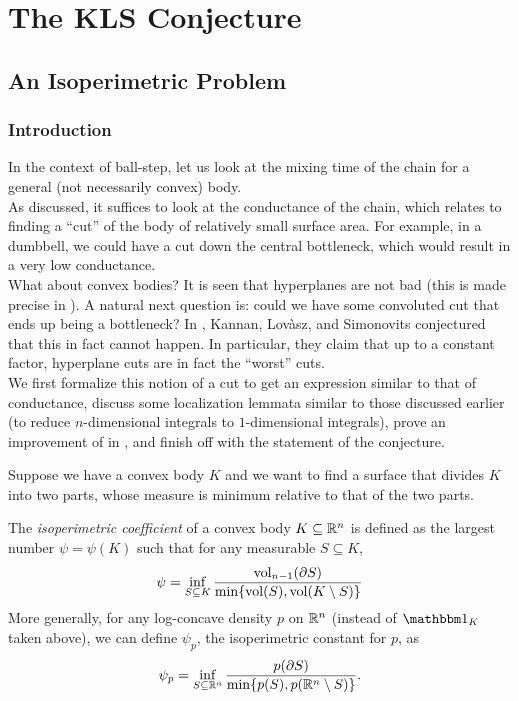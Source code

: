 \section{The KLS Conjecture}

\subsection{An Isoperimetric Problem}

	\subsubsection{Introduction}

		In the context of ball-step, let us look at the mixing time of the chain for a general (not necessarily convex) body.\\
		As discussed, it suffices to look at the conductance of the chain, which relates to finding a ``cut'' of the body of relatively small surface area. For example, in a dumbbell, we could have a cut down the central bottleneck, which would result in a very low conductance.\\
		What about convex bodies? It is seen that hyperplanes are not bad (this is made precise in ). A natural next question is: could we have some convoluted cut that ends up being a bottleneck? In \cite{KLSConjecture}, Kannan, Lov\`asz, and Simonovits conjectured that this in fact cannot happen. In particular, they claim that up to a constant factor, hyperplane cuts are in fact the ``worst'' cuts.\\
		We first formalize this notion of a cut to get an expression similar to that of conductance, discuss some localization lemmata similar to those discussed earlier (to reduce $n$-dimensional integrals to $1$-dimensional integrals), prove an improvement of  in , and finish off with the statement of the conjecture.

		Suppose we have a convex body $K$ and we want to find a surface that divides $K$ into two parts, whose measure is minimum relative to that of the two parts.

		\begin{fdef}
			\label{def: isoperimetric coefficient}
			The \textit{isoperimetric coefficient} of a convex body $K\subseteq\mathbb{R}^n$ is defined as the largest number $\psi=\psi(K)$ such that for any measurable $S\subseteq K$,
			\[ \psi = \inf_{S\subseteq K} \frac{\operatorname{vol}_{n-1}(\partial S)}{\min\{\operatorname{vol}(S),\operatorname{vol}(K\setminus S)\}} \]
			More generally, for any log-concave density $p$ on $\mathbb{R}^n$ (instead of $\indic_K$ taken above), we can define $\psi_p$, the isoperimetric constant for $p$, as
			\[ \psi_p = \inf_{S\subseteq\mathbb{R}^n} \frac{p(\partial S)}{\min\{p(S),p(\mathbb{R}^n\setminus S)\}}. \]
		\end{fdef}

